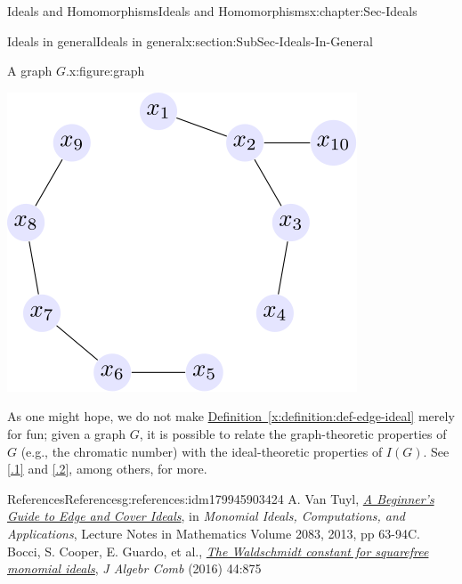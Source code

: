 \documentclass[oneside,10pt,]{book}
\newcommand{\xreffont}{\relax}
\numberwithin{equation}{section}
\begin{document}
\begin{chapterptx}{Ideals and Homomorphisms}{}{Ideals and Homomorphisms}{}{}{x:chapter:Sec-Ideals}
\begin{sectionptx}{Ideals in general}{}{Ideals in general}{}{}{x:section:SubSec-Ideals-In-General}
\begin{figureptx}{A graph \(G\).}{x:figure:graph}{}
\begin{image}{0.25}{0.5}{0.25}
\includegraphics[width=\linewidth]{./images/graph.svg}
\end{image}%
\tcblower
\end{figureptx}%
As one might hope, we do not make \hyperref[x:definition:def-edge-ideal]{Definition~{\xreffont\ref{x:definition:def-edge-ideal}}} merely for fun; given a graph \(G\), it is possible to relate the graph-theoretic properties of \(G\) (e.g., the chromatic number) with the ideal-theoretic properties of \(I(G)\). See \hyperlink{x:biblio:vantuyl-intro}{[{\xreffont 4.1.1}]} and \hyperlink{x:biblio:mfo-waldschmidt}{[{\xreffont 4.1.2}]}, among others, for more.%
%
%
\typeout{************************************************}
\typeout{************************************************}
%
\begin{references-subsection-numberless}{References}{}{References}{}{}{g:references:idm179945903424}
A. Van Tuyl, \emph{\href{http://dx.doi.org/doi:10.1007/978-3-642-38742-5_3}{A Beginner's Guide to Edge and Cover Ideals}}, in \emph{Monomial Ideals, Computations, and Applications}, Lecture Notes in Mathematics Volume 2083, 2013, pp 63-94C. Bocci, S. Cooper, E. Guardo, et al., \emph{\href{https://doi.org/10.1007/s10801-016-0693-7}{The Waldschmidt constant for squarefree monomial ideals}}, \emph{J Algebr Comb} (2016) 44:875\end{references-subsection-numberless}
\end{sectionptx}
%
%
\typeout{************************************************}

\end{chapterptx}
\end{document}
